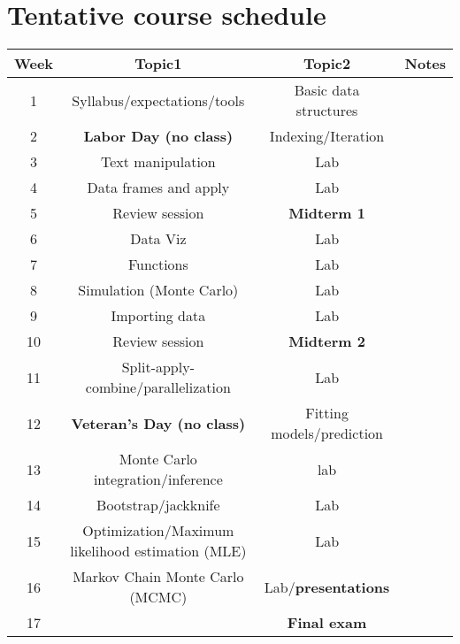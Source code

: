 \documentclass[11pt,onecolumn]{article}
\begin{document}
\section*{Tentative course schedule}
\begin{center}
  \begin{tabular}{|c|c|c|c|}
    \hline
    Week & Topic1 & Topic2 & Notes \\
    \hline
    1 & Syllabus/expectations/tools & Basic data structures &  \\
    \hline
    2 & \textbf{Labor Day (no class)} & Indexing/Iteration &  \\
    \hline
    3 & Text manipulation & Lab & \\
    \hline
    4 & Data frames and apply & Lab &  \\
    \hline
    5 & Review session & \textbf{Midterm 1} & \\
    \hline
    6 & Data Viz & Lab  & \\
    \hline
    7 & Functions & Lab & \\
    \hline
    8 & Simulation (Monte Carlo) & Lab & \\
    \hline
    9 & Importing data & Lab & \\
    \hline
    10 & Review session & \textbf{Midterm 2} & \\
    \hline
    11 & Split-apply-combine/parallelization & Lab & \\
    \hline
    12 & \textbf{Veteran's Day (no class)} & Fitting models/prediction & \\
    \hline
    13 & Monte Carlo integration/inference & lab & \\
    \hline
    14 & Bootstrap/jackknife & Lab & \\
    \hline
    15 & Optimization/Maximum likelihood estimation (MLE) & Lab & \\
    \hline
    16 & Markov Chain Monte Carlo (MCMC) & Lab/\textbf{presentations} & \\
    \hline
    17 & & \textbf{Final exam} & \\
    \hline
\end{tabular}
\end{center}
\end{document}
